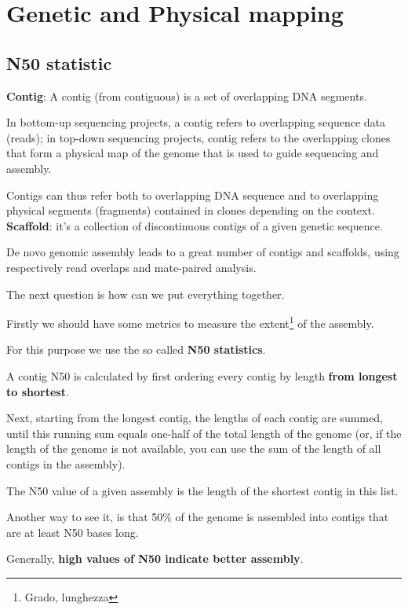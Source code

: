 \section{Genetic and Physical mapping}

\subsection{N50 statistic}

\textbf{Contig}: A contig (from contiguous) is a set of overlapping DNA
segments.

In bottom-up sequencing projects, a contig refers to overlapping sequence
data (reads); in top-down sequencing projects, contig refers to the
overlapping clones that form a physical map of the genome that is used
to guide sequencing and assembly.

Contigs can thus refer both to overlapping DNA sequence and to overlapping
physical segments (fragments) contained in clones depending on the context. \\

\textbf{Scaffold}: it's a collection of discontinuous contigs of a given
genetic sequence.

De novo genomic assembly leads to a great number of contigs and scaffolds,
using respectively read overlaps and mate-paired analysis.

The next question is how can we put everything together.


Firstly we should have some metrics to measure the extent\footnote{Grado,
lunghezza} of the assembly.

For this purpose we use the so called \textbf{N50 statistics}.

A contig N50 is calculated by first ordering every contig by length
\textbf{from longest to shortest}.

Next, starting from the longest contig, the lengths of each contig are
summed, until this running sum equals one-half of the total length of the
genome (or, if the length of the genome is not available, you can use the sum
of the length of all contigs in the assembly).

The N50 value of a given assembly is the length of the shortest contig in this
list.

Another way to see it, is that 50\% of the genome is assembled into contigs
that are at least N50 bases long.

Generally, \textbf{high values of N50 indicate better assembly}.

